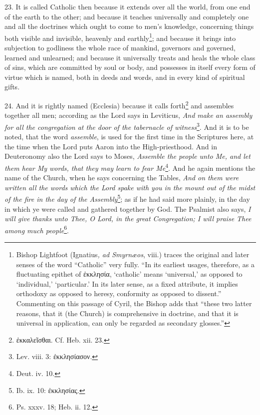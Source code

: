 23. It is called Catholic then because it extends over all the world, from one end of the earth to the other; and because it teaches universally and completely one and all the doctrines which ought to come to men’s knowledge, concerning things both visible and invisible, heavenly and earthly\footnote{Bishop Lightfoot (Ignatius\emph{, ad Smyrnæos}, viii.) traces the original and later senses of the word “Catholic” very fully. “In its earliest usages, therefore, as a fluctuating epithet of \textgreek{ἐκκλησία}, ‘catholic’ means ‘universal,’ as opposed to ‘individual,’ ‘particular.’ In its later sense, as a fixed attribute, it implies orthodoxy as opposed to heresy, conformity as opposed to dissent.” Commenting on this passage of Cyril, the Bishop adds that “these two latter reasons, that it (the Church) is comprehensive in doctrine, and that it is universal in application, can only be regarded as secondary glosses.”}; and because it brings into subjection to godliness the whole race of mankind, governors and governed, learned and unlearned; and because it universally treats and heals the whole class of sins, which are committed by soul or body, and possesses in itself every form of virtue which is named, both in deeds and words, and in every kind of spiritual gifts.

24. And it is rightly named (Ecclesia) because it calls forth\footnote{\textgreek{ἐκκαλεῖσθαι}. Cf. Heb. xii. 23.} and assembles together all men; according as the Lord says in Leviticus, \emph{And make an assembly for all the congregation at the door of the tabernacle of witness}\footnote{Lev. viii. 3: \textgreek{ἐκκλησίασον}.}. And it is to be noted, that the word \emph{assemble}, is used for the first time in the Scriptures here, at the time when the Lord puts Aaron into the High-priesthood. And in Deuteronomy also the Lord says to Moses, \emph{Assemble the people unto Me, and let them hear My words, that they may learn to fear Me}\footnote{Deut. iv. 10.}. And he again mentions the name of the Church, when he says concerning the Tables, \emph{And on them were written all the words which the Lord spake with you in the mount out of the midst of the fire in the day of the Assembly}\footnote{Ib. ix. 10: \textgreek{ἐκκλησίας}.}; as if he had said more plainly, in the day in which ye were called and gathered together by God. The Psalmist also says, \emph{I will give thanks unto Thee, O Lord, in the great Congregation; I will praise Thee among much people}\footnote{Ps. xxxv. 18; Heb. ii. 12.}.

